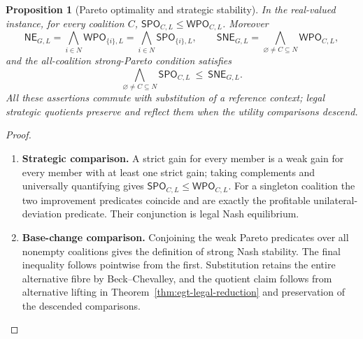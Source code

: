 \documentclass[11pt,a4paper]{article}
\numberwithin{equation}{section}
\newtheorem{proposition}[theorem]{Proposition}
\theoremstyle{definition}
\theoremstyle{remark}
\theoremstyle{plain}
\begin{document}
\begin{proposition}[Pareto optimality and strategic stability]
\label{prop:egt-pareto-optimality}
In the real-valued instance, for every coalition $C$,
$\mathsf{SPO}_{C,L}\leq\mathsf{WPO}_{C,L}$. Moreover
\[
 \mathsf{NE}_{G,L}
 =\bigwedge_{i\in N}\mathsf{WPO}_{\{i\},L}
 =\bigwedge_{i\in N}\mathsf{SPO}_{\{i\},L},
 \qquad
 \mathsf{SNE}_{G,L}
 =\bigwedge_{\varnothing\ne C\subseteq N}\mathsf{WPO}_{C,L},
\]
and the all-coalition strong-Pareto condition satisfies
\[
 \bigwedge_{\varnothing\ne C\subseteq N}\mathsf{SPO}_{C,L}
 \ \leq\ \mathsf{SNE}_{G,L}.
\]
All these assertions commute with substitution of a reference context;
legal strategic quotients preserve and reflect them when the utility
comparisons descend.
\end{proposition}
\begin{proof}
\leavevmode
\begin{enumerate}[label=\textup{(\arabic*)},leftmargin=*,itemsep=4pt,topsep=3pt]
  \item \textbf{Strategic comparison.} A strict gain for every member is a weak gain for every member with at
least one strict gain; taking complements and universally quantifying
gives $\mathsf{SPO}_{C,L}\leq\mathsf{WPO}_{C,L}$. For a singleton
coalition the two improvement predicates coincide and are exactly the
profitable unilateral-deviation predicate. Their conjunction is legal
Nash equilibrium.
  \item \textbf{Base-change comparison.} Conjoining the weak Pareto predicates over all
nonempty coalitions gives the definition of strong Nash stability. The final inequality follows pointwise from the first. Substitution
retains the entire alternative fibre by Beck--Chevalley, and the
quotient claim follows from alternative lifting in
Theorem~\ref{thm:egt-legal-reduction} and preservation of the descended
comparisons.
\end{enumerate}
\end{proof}
\end{document}

